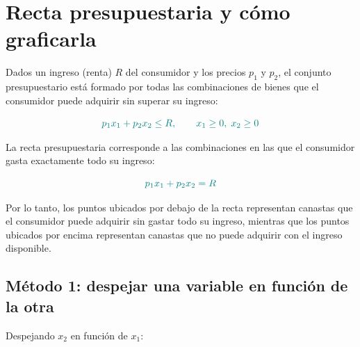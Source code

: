 \documentclass{article}
\begin{document}
\begin{center}
\end{center}


\section*{Recta presupuestaria y cómo graficarla}

Dados un ingreso (renta) \(R\) del consumidor y los precios \(p_1\) y \(p_2\), el {\color{teal}conjunto presupuestario} está formado por todas las combinaciones de bienes que el consumidor puede adquirir sin superar su ingreso:

\[
{\color{teal}
p_1x_1+p_2x_2\leq R,
\qquad
x_1\geq 0,\; x_2\geq 0
}
\]

La {\color{teal}recta presupuestaria} corresponde a las combinaciones en las que el consumidor gasta exactamente todo su ingreso:

\[
{\color{teal}
p_1x_1+p_2x_2=R
}
\]

Por lo tanto, los puntos ubicados por debajo de la recta representan canastas que el consumidor puede adquirir sin gastar todo su ingreso, mientras que los puntos ubicados por encima representan canastas que no puede adquirir con el ingreso disponible.

\subsection*{Método 1: despejar una variable en función de la otra}

Despejando \(x_2\) en función de \(x_1\):
\end{document}
